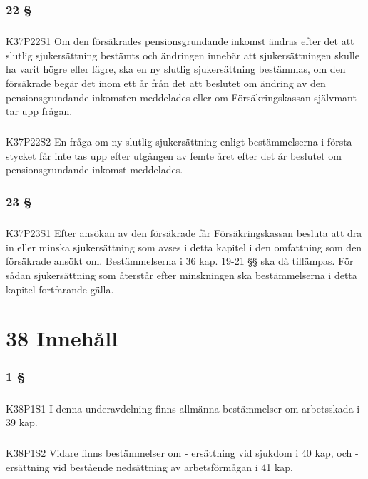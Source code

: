 \documentclass[a4paper,notitlepage,openany,10pt]{book}
\begin{document}
\subsection*{22 §}
\paragraph*{}
{\tiny K37P22S1}
Om den försäkrades pensionsgrundande inkomst ändras efter det att slutlig sjukersättning bestämts och ändringen innebär att sjukersättningen skulle ha varit högre eller lägre, ska en ny slutlig sjukersättning bestämmas, om den försäkrade begär det inom ett år från det att beslutet om ändring av den pensionsgrundande inkomsten meddelades eller om Försäkringskassan självmant tar upp frågan.
\paragraph*{}
{\tiny K37P22S2}
En fråga om ny slutlig sjukersättning enligt bestämmelserna i första stycket får inte tas upp efter utgången av femte året efter det år beslutet om pensionsgrundande inkomst meddelades.
\subsection*{23 §}
\paragraph*{}
{\tiny K37P23S1}
Efter ansökan av den försäkrade får Försäkringskassan besluta att dra in eller minska sjukersättning som avses i detta kapitel i den omfattning som den försäkrade ansökt om.
Bestämmelserna i 36 kap. 19-21 §§ ska då tillämpas. För sådan sjukersättning som återstår efter minskningen ska bestämmelserna i detta kapitel fortfarande gälla.
\chapter*{38 Innehåll}
\subsection*{1 §}
\paragraph*{}
{\tiny K38P1S1}
I denna underavdelning finns allmänna bestämmelser om arbetsskada i 39 kap.
\paragraph*{}
{\tiny K38P1S2}
Vidare finns bestämmelser om
\newline - ersättning vid sjukdom i 40 kap, och
\newline - ersättning vid bestående nedsättning av arbetsförmågan i 41 kap.
\end{document}
